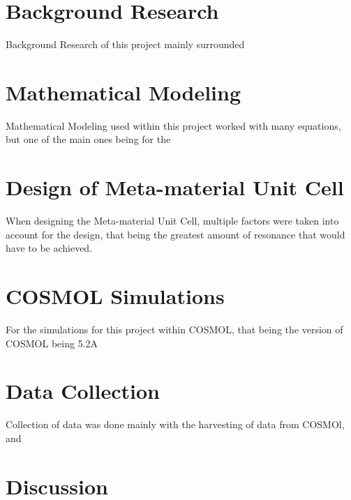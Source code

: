 \documentclass[]{article}
\begin{document}
\section{Background Research}
Background Research of this project mainly surrounded 
\section{Mathematical Modeling}
Mathematical Modeling used within this project worked with many equations, but one of the main ones being for the 
\section{Design of Meta-material Unit Cell}
When designing the Meta-material Unit Cell, multiple factors were taken into account for the design, that being the greatest amount of resonance that would have to be achieved. 
\section{COSMOL Simulations}
For the simulations for this project within COSMOL, that being the version of COSMOL being 5.2A
\section{Data Collection}
Collection of data was done mainly with the harvesting of data from COSMOl, and 
\section{Discussion}
\end{document}
